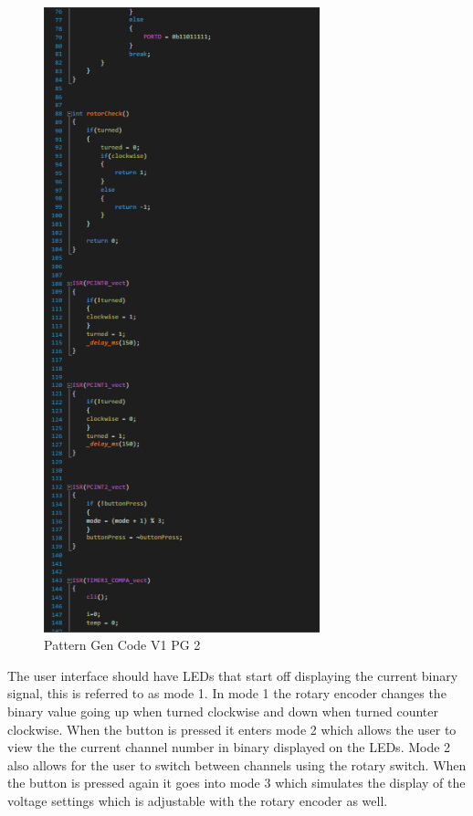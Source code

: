 \documentclass[12pt]{article}
\begin{document}
        \begin{figure}[htp]
            \centering
            \includegraphics[width=8cm]{Pattern Gen Code V1 PG 2.png}
            \caption{Pattern Gen Code V1 PG 2}
        \end{figure}

        \par The user interface should have LEDs that start off displaying the current binary signal, this is referred to as mode 1. In mode 1 the rotary encoder changes the binary value going up when turned clockwise and down when turned counter clockwise. When the button is pressed it enters mode 2 which allows the user to view the the current channel number in binary displayed on the LEDs. Mode 2 also allows for the user to switch between channels using the rotary switch. When the button is pressed again it goes into mode 3 which simulates the display of the voltage settings which is adjustable with the rotary encoder as well.
\end{document}

